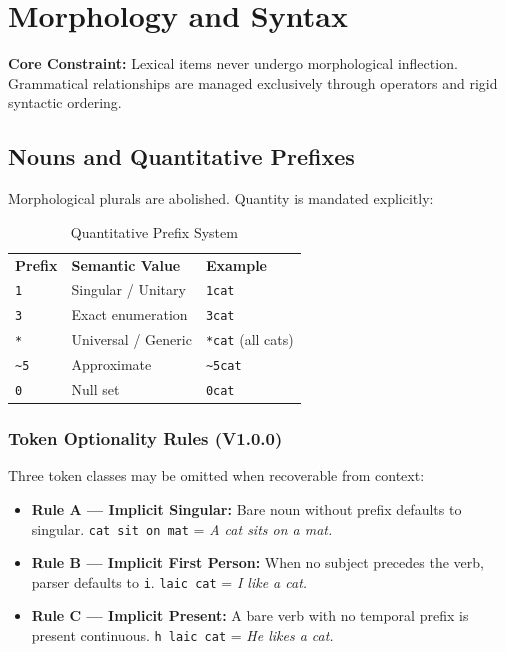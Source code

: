 \documentclass[12pt,onecolumn,letterpaper]{article}
\newcommand{\me}[1]{\texttt{#1}}
\newcommand{\MEtablelayout}{%
\footnotesize
\setlength{\tabcolsep}{6pt}%
\renewcommand{\arraystretch}{1.12}%
\arrayrulecolor{MERule}%
}
\begin{document}
\section{Morphology and Syntax}

\textbf{Core Constraint:} Lexical items never undergo morphological inflection.
Grammatical relationships are managed exclusively through operators and
rigid syntactic ordering.

\subsection{Nouns and Quantitative Prefixes}
Morphological plurals are abolished. Quantity is mandated explicitly:

\begin{table}[h!]
\centering
\MEtablelayout
\begin{tabularx}{\linewidth}{lXl}
\rowcolor{MEGray}
\textbf{Prefix} & \textbf{Semantic Value} & \textbf{Example} \\
\me{1}     & Singular / Unitary  & \me{1cat} \\
\me{3}     & Exact enumeration   & \me{3cat} \\
\me{*}     & Universal / Generic & \me{*cat} (all cats) \\
\me{\~{}5} & Approximate         & \me{\~{}5cat} \\
\me{0}     & Null set            & \me{0cat} \\
\bottomrule
\end{tabularx}
\caption{Quantitative Prefix System}
\end{table}

\subsubsection{Token Optionality Rules (V1.0.0)}
Three token classes may be omitted when recoverable from context:
\begin{itemize}[leftmargin=*]
    \item \textbf{Rule A --- Implicit Singular:} Bare noun without prefix defaults to singular. \me{cat sit on mat} = \textit{A cat sits on a mat.}
    \item \textbf{Rule B --- Implicit First Person:} When no subject precedes the verb, parser defaults to \me{i}. \me{laic cat} = \textit{I like a cat.}
    \item \textbf{Rule C --- Implicit Present:} A bare verb with no temporal prefix is present continuous. \me{h laic cat} = \textit{He likes a cat.}
\end{itemize}
\end{document}
